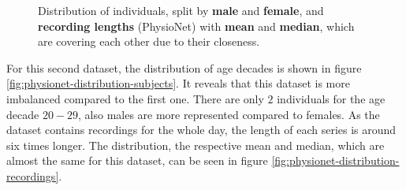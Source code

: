\documentclass[11pt]{scrartcl}
\begin{document}
\begin{figure}[hbt]
	\caption{Distribution of individuals, split by \textcolor{viridis0}{\textbf{male}} and \textcolor{viridis9}{\textbf{female}}, and \textcolor{viridis5}{\textbf{recording lengths}} (PhysioNet) with \textcolor{viridis9}{\textbf{mean}} and \textcolor{viridis0}{\textbf{median}}, which are covering each other due to their closeness.}
\end{figure}

For this second dataset, the distribution of age decades is shown in figure \ref{fig:physionet-distribution-subjects}. It reveals that this dataset is more imbalanced compared to the first one. There are only $2$ individuals for the age decade $20-29$, also males are more represented compared to females. As the dataset contains recordings for the whole day, the length of each series is around six times longer. The distribution, the respective mean and median, which are almost the same for this dataset, can be seen in figure \ref{fig:physionet-distribution-recordings}.
\end{document}
